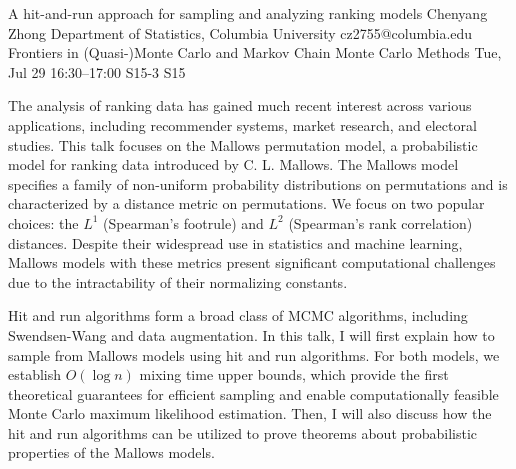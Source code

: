 \documentclass[12pt,lettersize,oneside]{book} %
\begin{document}
\begin{talk}
  {A hit-and-run approach for sampling and analyzing ranking models}%
  {Chenyang Zhong}%
  {Department of Statistics, Columbia University}%
  {cz2755@columbia.edu}%
  {Frontiers in (Quasi-)Monte Carlo and Markov Chain Monte Carlo Methods}%
  {}%
  {Tue, Jul 29 16:30--17:00}%
  {S15-3}%
  {S15}%
    
   
The analysis of ranking data has gained much recent interest across various applications, including recommender systems, market research, and electoral studies. This talk focuses on the Mallows permutation model, a probabilistic model for ranking data introduced by C. L. Mallows. The Mallows model specifies a family of non-uniform probability distributions on permutations and is characterized by a distance metric on permutations. We focus on two popular choices: the $L^1$ (Spearman’s footrule) and $L^2$ (Spearman’s rank correlation) distances. Despite their widespread use in statistics and machine learning, Mallows models with these metrics present significant computational challenges due to the intractability of their normalizing constants.

Hit and run algorithms form a broad class of MCMC algorithms, including Swendsen-Wang and data augmentation. In this talk, I will first explain how to sample from Mallows models using hit and run algorithms. For both models, we establish $O(\log n)$ mixing time upper bounds, which provide the first theoretical guarantees for efficient sampling and enable computationally feasible Monte Carlo maximum likelihood estimation. Then, I will also discuss how the hit and run algorithms can be utilized to prove theorems about probabilistic properties of the Mallows models.

\medskip


\end{talk}
\end{document}
